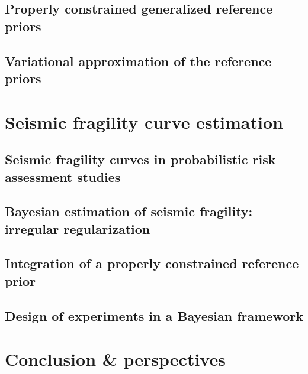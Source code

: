 \documentclass[a4paper]{book}
\begin{document}



\chapter{Properly constrained generalized reference priors}




\chapter{Variational approximation of the reference priors}




\part{Seismic fragility curve estimation}


\chapter{Seismic fragility curves in probabilistic risk assessment studies}




\chapter{Bayesian estimation of seismic fragility: irregular regularization}




\chapter{Integration of a properly constrained reference prior}




\chapter{Design of experiments in a Bayesian framework}






\part{Conclusion \& perspectives}
\end{document}
